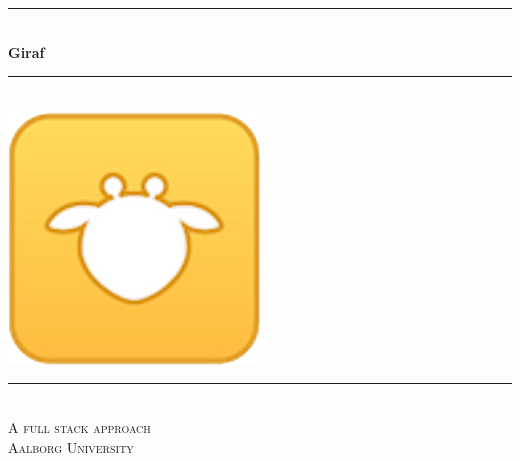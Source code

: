 \begin{titlingpage}

  \centering
  \rule{\linewidth}{0.2 mm} \\[0.5 cm]
  { \huge \bfseries Giraf}\\
  \rule{\linewidth}{0.2 mm} \\[2 cm]
  \includegraphics[scale=0.70]{images/giraf_logo.png}\\[2 cm]
  \rule{\linewidth}{0.2 mm} \\[0.3 cm]
  \textsc{\LARGE A full stack approach} \\[0.5 cm]
  \textsc{\large Aalborg University}\\[0.5 cm]
  {\Large \groupnumber}\\[0.5 cm]

\end{titlingpage}
